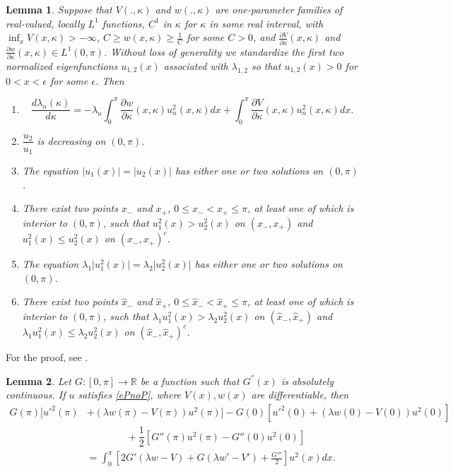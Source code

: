 \documentclass[12pt,a4paper]{amsart}
\newtheorem{lem}{Lemma}[section]
\begin{document}
\begin{lem}\label{F-H}
Suppose that $V(.,\kappa)$ and $w(.,\kappa)$ are one-parameter families of real-valued, locally $L^1$ functions, \( C^1 \) in \( \kappa \) for \( \kappa \) in some real interval, with
$\inf_{x} V(x,\kappa) > - \infty$, $C \ge w(x,\kappa) \ge \frac 1 C$ for some $C > 0$, and
$\frac{\partial V}{\partial \kappa}(x,\kappa)$
and $\frac{\partial w}{\partial \kappa}(x,\kappa) \in L^1(0, \pi)$. Without loss of generality we standardize the first two normalized eigenfunctions $u_{1,2}(x)$ associated with 
$\lambda_{1,2}$
so that
$u_{1,2}(x) > 0$ for $0 < x < \epsilon$ for some $\epsilon$.  Then
\begin{enumerate}
\item \[
\frac{d\lambda_{n}(\kappa)}{d\kappa}=-\lambda_{n}\int_{0}^{\pi}\frac{\partial w}{\partial \kappa}(x,\kappa)u_{n}^{2}(x,\kappa)dx+\int_{0}^{\pi}\frac{\partial V}{\partial \kappa}(x,\kappa)u_{n}^{2}(x,\kappa)dx .
\]
\item
$\dfrac{u_{2}}{u_{1}} $ is decreasing on $(0,\pi)$.

\item The equation $ \vert u_{1}(x)\vert=\vert u_{2}(x)\vert $ has
either one or two solutions on $(0,\pi)$.
 \item There exist two points $x_{-}$ and $x_{+}$,
  $ 0 \leq x_{-}< x_{+} \leq \pi $, at least one of which is interior to $(0, \pi)$, such that 
$u_{1}^{2}(x)>u_{2}^{2}(x)$ on $(x_{-},x_{+})$ and $u_{1}^{2}(x)\le u_{2}^{2}(x)$ on $(x_{-},x_{+})^c$.
\item
The equation $ \lambda_1 \vert u_{1}^2(x)\vert=\lambda_2 \vert u_{2}^2(x)\vert $ has
either one or two
solutions on $(0,\pi)$.
 \item 
There exist two points $\widehat{x}_{-}$ and $\widehat{x}_{+}$,
  $ 0 \leq \widehat{x}_{-}< \widehat{x}_{+} \leq \pi $, at least one of which is interior to $(0, \pi)$, such that 
$\lambda_1 u_{1}^{2}(x)> \lambda_2 u_{2}^{2}(x)$ on $(\widehat{x}_{-},\widehat{x}_{+})$ and $\lambda_1 u_{1}^{2}(x)\le \lambda_2 u_{2}^{2}(x)$ on $(\widehat{x}_{-},\widehat{x}_{+})^c$.
\end{enumerate}

\end{lem}

\noindent
{For the proof,  see \cite{AHRA}.}



\begin{lem}\label{G'''}
Let $G:[0,\pi]\to\mathbb{R}$ be a function such that $G^{''}(x)$ is absolutely continuous. If $u$ satisfies \eqref{ePnoP}, where $V(x),w(x)$ are differentiable, then
\begin{align*}
G(\pi)[u'^{2}(\pi)&+(\lambda w(\pi)-V(\pi))u^{2}(\pi)]-G(0)[u'^{2}(0)+(\lambda w(0)-V(0))u^{2}(0)]\\
&\quad\quad\quad\quad+ \dfrac{1}{2}[G''(\pi)u^{2}(\pi)-G''(0)u^{2}(0)]\\
&=\int_{0}^{\pi}\left[2G'(\lambda w-V)+G(\lambda w'-V')+\frac{G'''}{2}\right]
u^{2}(x)dx.
\end{align*}
\end{lem}
\end{document}
